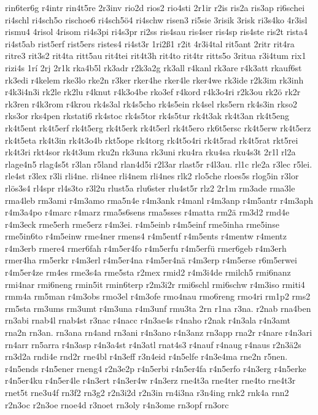 {rin6ter6g
r4intr
rin4t5re
2r3inv
rio2d
rios2
rio4sti
2r1ir
r2is
ris2a
ris3ap
ri6schei
ri4schl
ri4sch5o
rischoe6
ri4sch5ö4
ri4schw
risen3
ri5sie
3risik
3risk
ri3s4ko
4r3isl
rismu4
4risol
4risom
ri4s3pi
ri4s3pr
ri2ss
ris4sau
ris4ser
ris4sp
ris4ste
ris2t
rista4
ri4st5ab
rist5erf
rist5ers
ristes4
ri4st3r
1ri2ß1
r2it
4r3i4tal
rit5ant
2ritr
rit4ra
ritre3
rit3s2
rit4ta
ritt5au
rit4tei
rit4t3h
rit4to
rit4tr
ritts5o
3ritua
r3i4tum
rix1
rizi4s
1rí
2rj
2r1k
rka4b5l
rk3adr
r2k3a2g
rk3all
r4kanl
rk3are
r4k3att
rkauf6st
rk3edi
r4kelem
rke3lo
rke2n
r3ker
rker4he
rker4le
rker4we
rk3ide
r2k3im
rk3inh
r4k3i4n3i
rk2le
rk2lu
r4knut
r4k3o4be
rko3ef
r4kord
r4k3o4ri
r2k3ou
rk2ö
rk2r
rk3ren
r4k3rom
r4krou
rk4s3al
rk4s5cho
rk4s5ein
rk4sel
rks5ern
rk4s3in
rkso2
rks3or
rks4pen
rkstati6
rk4stoc
rk4s5tor
rk4s5tur
rk4t3ak
rk4t3an
rk4t5eng
rk4t5ent
rk4t5erf
rk4t5erg
rk4t5erk
rk4t5erl
rk4t5ero
rk6t5ersc
rk4t5erw
rk4t5erz
rk4t5eta
rk4t3in
rk4t3o4b
rkt5ope
rk4torg
rk4t5o4ri
rk4t5rad
rk4t5rat
rkt5rei
rk4t3ri
rkt4sor
rk4t3um
rku2n
rk3una
rk3uni
rku4ra
rku4sa
rku4s3t
2r1l
rl2a
rlage4n5
rlag4s5t
r3lan
r5land
rlan4d5i
r2l3ar
rlast5r
r4l3au.
rl1c
rle2a
r3lec
r5lei.
rle4st
r3lex
r3li
rli4ne.
rli4nee
rli4nem
rli4nes
rlk2
rlo5che
rloes5s
rlog5in
r3lor
rlös3s4
rl4spr
rl4s3to
r3l2u
rlust5a
rlu6ster
rlu4st5r
rlz2
2r1m
rm3ade
rma3le
rma4leb
rm3ami
r4m3amo
rma5n4e
r4m3ank
r4manl
r4m3anp
r4m5antr
r4m3aph
r4m3a4po
r4marc
r4marz
rma5s6sens
rma5sses
r4matta
rm2ä
rm3d2
rmd4e
r4m3eck
rme5erh
rme5erz
r4m3ei.
r4m5einb
r4m5einf
rme5inha
rme5inse
rme5in6to
r4m5einw
rme4ner
rmens4
r4m5entf
r4m5ents
r4mentw
r4mentz
r4m3erb
rmere4
rmer6fah
r4m5er4fo
r4m5erfu
r4m5erfü
rmer6geb
r4m3erh
rmer4ha
rm5erkr
r4m3erl
r4m5er4na
r4m5er4nä
r4m3erp
r4m5erse
r6m5erwei
r4m5er4ze
rm4es
rme3s4a
rme5sta
r2mex
rmid2
r4m3i4de
rmilch5
rmi6nanz
rmi4nar
rmi6neng
rmin5it
rmin6terp
r2m3i2r
rmi6schl
rmi6schw
r4m3iso
rmiti4
rmm4a
rm5man
r4m3obs
rmo3el
r4m3ofe
rmo4nau
rmo6reng
rmo4ri
rm1p2
rms2
rm5sta
rm3ums
rm3umt
r4m3una
r4m3unf
rmu3ta
2rn
r1na
r3na.
r2nab
rna4ben
rn3abi
rnab4l
rnab4st
r3nac
r4nacc
r4n3ae4s
r4naho
r2nak
r4n3ala
r4n3amt
rna2n
rn3an.
rn3ana
rn4and
rn3ani
r4n3ano
r4n3anz
rn3app
rna2r
r4nare
r4n3ari
rn4arr
rn5arra
r4n3asp
r4n3a4st
r4n3atl
rnat4s3
r4nauf
r4naug
r4naus
r2n3ä2s
rn3d2a
rndi4e
rnd2r
rne4bl
r4n3eff
r3n4eid
r4n5elfe
r4n3e4ma
rne2n
r5nen.
r4n5ends
r4n5ener
rneng4
r2n3e2p
r4n5erbi
r4n5er4fa
r4n5erfo
r4n3erg
r4n5erke
r4n5er4ku
r4n5er4le
r4n3ert
r4n3er4w
r4n3erz
rne4t3a
rne4ter
rne4to
rne4t3r
rnet5t
rne3u4f
rn3f2
rn3g2
r2n3i2d
r2n3in
rn4i3na
r3n4ing
rnk2
rnk4a
rnn2
r2n3oc
r2n3oe
rnoe4d
r3noet
rn3oly
r4n3ome
rn3opf
rn3orc
}
